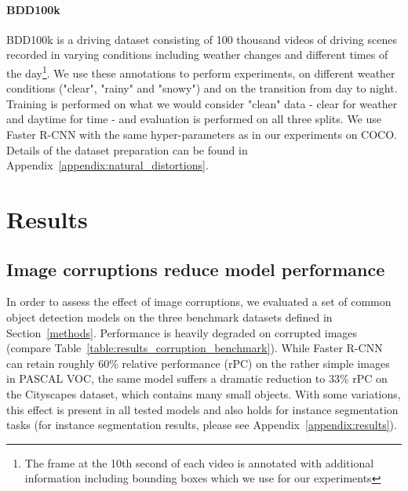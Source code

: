 \documentclass{article}
\begin{document}
\paragraph{BDD100k}
BDD100k \cite{yu2018bdd100k} is a driving dataset consisting of 100 thousand videos of driving scenes recorded in varying conditions including weather changes and different times of the day\footnote{The frame at the 10th second of each video is annotated with additional information including bounding boxes which we use for our experiments}. We use these annotations to perform experiments, on different weather conditions ("clear", "rainy" and "snowy") and on the transition from day to night. Training is performed on what we would consider "clean" data - clear for weather and daytime for time - and evaluation is performed on all three splits. We use Faster R-CNN with the same hyper-parameters as in our experiments on COCO. Details of the dataset preparation can be found in Appendix~\ref{appendix:natural_distortions}. \section{Results}
  \label{results}
  
\subsection{Image corruptions reduce model performance}
In order to assess the effect of image corruptions, we evaluated a set of common object detection models on the three benchmark datasets defined in Section~\ref{methods}. Performance is heavily degraded on corrupted images (compare Table~\ref{table:results_corruption_benchmark}). While Faster R-CNN can retain roughly 60\% relative performance (rPC) on the rather simple images in PASCAL VOC, the same model suffers a dramatic reduction to 33\% rPC on the Cityscapes dataset, which contains many small objects. With some variations, this effect is present in all tested models and also holds for instance segmentation tasks (for instance segmentation results, please see Appendix~\ref{appendix:results}).
\end{document}
